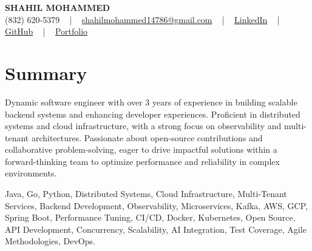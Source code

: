 \documentclass[letterpaper,10pt]{article}
\begin{document}
\begin{center}
    {\fontsize{14pt}{12pt}\selectfont \textbf{\MakeUppercase{Shahil Mohammed}}}\\ \vspace{2pt}
    \fontsize{10pt}{12pt}\selectfont (832) 620-5379 ~ | ~ \href{mailto:shahilmohammed14786@gmail.com}{shahilmohammed14786@gmail.com} ~ | ~  
    \href{https://www.linkedin.com/in/shahil-mohammed-9652931a1/}{\color{blue}\underline{LinkedIn}}  ~ | ~ 
    \href{https://github.com/freakbeast14}{\color{blue}\underline{GitHub}} ~ | ~ 
    \href{https://shahil-mohammed.netlify.app/}{\color{blue}\underline{Portfolio}}
    \vspace{-8pt}
\end{center}

\section{Summary}
\vspace{-2pt}\fontsize{8pt}{9pt}\selectfont
Dynamic software engineer with over 3 years of experience in building scalable backend systems and enhancing developer experiences. Proficient in distributed systems and cloud infrastructure, with a strong focus on observability and multi-tenant architectures. Passionate about open-source contributions and collaborative problem-solving, eager to drive impactful solutions within a forward-thinking team to optimize performance and reliability in complex environments.
 \vspace{-5pt}
 
{\fontsize{1pt}{1pt}\selectfont\color{white}
Java, Go, Python, Distributed Systems, Cloud Infrastructure, Multi-Tenant Services, Backend Development, Observability, Microservices, Kafka, AWS, GCP, Spring Boot, Performance Tuning, CI/CD, Docker, Kubernetes, Open Source, API Development, Concurrency, Scalability, AI Integration, Test Coverage, Agile Methodologies, DevOps.
}
\vspace{-8pt}

\vspace{-2pt}
\end{document}
